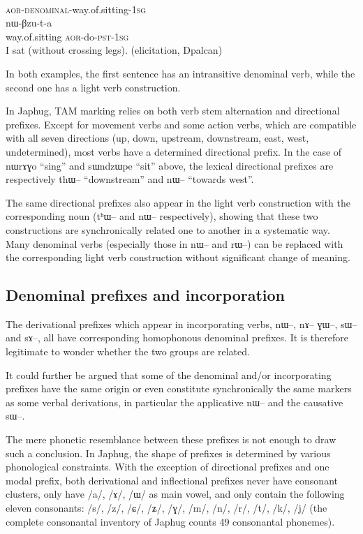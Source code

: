 \documentclass[oldfontcommands,oneside,a4paper,11pt]{article}
\newcommand{\ipa}[1]{{\phon #1}} %
\newcommand{\aor}{\textsc{aor}}
\newcommand{\pst}{\textsc{pst}}
\newcommand{\sg}{\textsc{sg}}
\begin{document}
 \begin{exe}
\ex
\begin{xlist}[(ii)]
\gll    \ipa{nɯ-sɯ-ndzɯpe-a}	 \\
 \aor{}-\textsc{denominal}-way.of.sitting-1\sg{} \\
 \gll    \ipa{ndzɯpe} \ipa{nɯ-βzu-t-a}	 \\
 way.of.sitting \aor{}-do-\pst{}-1\sg{} \\
 \glt  I sat (without crossing legs). (elicitation, Dpalcan)
  \end{xlist}
\end{exe} 
In both examples, the first sentence has an intransitive denominal verb, while the second one has a light verb construction. 

In Japhug,  TAM marking relies on both verb stem alternation and directional prefixes. Except for movement verbs and some action verbs, which are compatible with all seven directions (up, down, upstream, downstream, east, west, undetermined), most verbs have a  determined directional prefix. In the case of \ipa{nɯrɤɣo} ``sing'' and \ipa{sɯndzɯpe} ``sit'' above, the lexical directional prefixes are respectively \ipa{thɯ}-- ``downstream'' and \ipa{nɯ}-- ``towards west''. 

The same directional prefixes also appear in the light verb construction with the corresponding noun (\ipa{tʰɯ}--   and \ipa{nɯ}-- respectively), showing that these two constructions are synchronically related one to another in a systematic way. Many denominal verbs (especially those in \ipa{nɯ}-- and \ipa{rɯ}--) can be replaced with the corresponding light verb construction without significant change of meaning.

 \subsection{Denominal prefixes and incorporation}
The derivational prefixes which appear in incorporating verbs, \ipa{nɯ}--,	\ipa{nɤ}--	 
\ipa{ɣɯ}--, \ipa{sɯ}-- and \ipa{sɤ}--, all have corresponding homophonous denominal prefixes. It is therefore legitimate to wonder whether the two groups are related.


It could further be argued that  some of the denominal  and/or incorporating prefixes have the same origin or even constitute synchronically the same markers as some verbal derivations, in particular the applicative \ipa{nɯ}-- and the causative \ipa{sɯ}--. 

The mere phonetic resemblance between these prefixes is not enough to draw such a conclusion. In Japhug, the shape of prefixes is determined by various phonological constraints. With the exception of directional prefixes and one modal prefix, both derivational and inflectional prefixes never have consonant clusters, only have /a/, /ɤ/, /ɯ/ as main vowel, and only contain the  following eleven consonants: /s/, /z/, /ɕ/, /ʑ/, /ɣ/, /m/, /n/, /r/, /t/, /k/, /j/ (the complete consonantal inventory of Japhug counts 49 consonantal phonemes).
\end{document}
